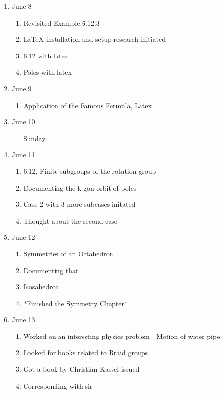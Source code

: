 \begin{enumerate}
		\item June 8
		\begin{enumerate}
		\item Revisited Example 6.12.3
		\item LaTeX installation and setup research initiated
		\item 6.12 with latex
		\item Poles with latex
		\end{enumerate}
		
		\item June 9
		\begin{enumerate}
		\item Application of the Famous Formula, Latex
		\end{enumerate}
		
		\item June 10
		\begin{enumerate}
		\item [Sunday]
		\end{enumerate}
		
		\item June 11
		\begin{enumerate}
		\item 6.12, Finite subgroups of the rotation group
		\item Documenting the k-gon orbit of poles
		\item Case 2 with 3 more subcases initated
		\item Thought about the second case
		\end{enumerate}
		
		\item June 12
		\begin{enumerate}
		\item Symmetries of an Octahedron
		\item Documenting that
		\item Icosahedron
		\item *Finished the Symmetry Chapter*
		\end{enumerate}
		
		\item June 13
		\begin{enumerate}
		\item Worked on an interesting physics problem | Motion of water pipe
		\item Looked for books related to Braid groups
		\item Got a book by Christian Kassel issued
		\item Corresponding with sir
		\end{enumerate}
		

\end{enumerate}
